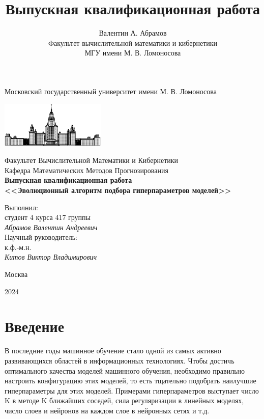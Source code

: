 \documentclass[a4paper,12pt]{article}
\title{Выпускная квалификационная работа}
\author{ Валентин А. Абрамов \\
	Факультет вычислительной математики и кибернетики\\
	МГУ имени М. В. Ломоносова\\
}
\date{}
\begin{document}
\begin{titlepage}
\begin{center}
    Московский государственный университет имени М. В. Ломоносова

    \bigskip
    \includegraphics[width=50mm]{msu.eps}

    \bigskip
    Факультет Вычислительной Математики и Кибернетики\\
    Кафедра Математических Методов Прогнозирования\\[10mm]

    \textsf{\large\bfseries
         Выпускная квалификационная работа\\[10mm]
        <<Эволюционный алгоритм подбора гиперпараметров моделей>>
    }\\[10mm]

    \begin{flushright}
        \parbox{0.5\textwidth}{
            Выполнил:\\
            студент 4 курса 417 группы\\
            \emph{Абрамов Валентин Андреевич}\\[5mm]
            Научный руководитель:\\
            к.ф.-м.н.\\
            \emph{Китов Виктор Владимирович}
        }
    \end{flushright}

    \vspace{\fill}
    Москва
    
    2024
\end{center}
\end{titlepage}
\setcounter{page}{2}
\tableofcontents
\newpage
\section{Введение}

В последние годы машинное обучение стало одной из самых активно 
развивающихся областей в информационных технологиях. Чтобы достичь 
оптимального качества моделей машинного обучения, необходимо правильно 
настроить конфигурацию этих моделей, то есть тщательно подобрать 
наилучшие гиперпараметры для этих моделей.
Примерами гиперпараметров выступает число K в методе K ближайших 
соседей, сила регуляризации в линейных моделях, число слоев и нейронов на 
каждом слое в нейронных сетях и т.д.
\end{document}
